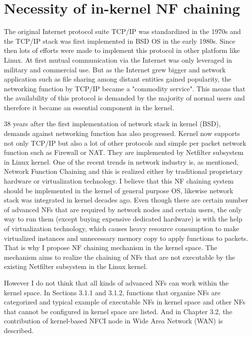 \section{Necessity of in-kernel NF chaining}
The original Internet protocol suite TCP/IP was standardized in the 1970s and the TCP/IP stack was first implemented in BSD OS in the early 1980s. Since then lots of efforts were made to implement this protocol in other platform like Linux. At first mutual communication via the Internet was only leveraged in military and commercial use. But as the Internet grew bigger and network application such as file sharing among distant entities gained popularity, the networking function by TCP/IP became a "commodity service". This means that the availability of this protocol is demanded by the majority of normal users and therefore it became an essential component in the kernel. 

 38 years after the first implementation of network stack in kernel (BSD), demands against networking function has also progressed. Kernel now supports not only TCP/IP but also a lot of other protocols and simple per packet network function such as Firewall or NAT. They are implemented by Netfilter subsystem in Linux kernel. One of the recent trends in network industry is, as mentioned, Network Function Chaining and this is realized either by traditional proprietary hardware or virtualization technology. I believe that this NF chaining system should be implemented in the kernel of general purpose OS, likewise network stack was integrated in kernel decades ago. Even though there are certain number of advanced NFs that are required by network nodes and certain users, the only way to run them (except buying expensive dedicated hardware) is with the help of virtualization technology, which causes heavy resource consumption to make virtualized instances and unnecessary memory copy to apply functions to packets. That is why I propose NF chaining mechanism in the kernel space. The mechanism aims to realize the chaining of NFs that are not executable by the existing Netfilter subsystem in the Linux kernel. 
 
 However I do not think that all kinds of advanced NFs can work within the kernel space. In Sections 3.1.1 and 3.1.2, functions that organize NFs are categorized and typical example of executable NFs in kernel space and other NFs that cannot be configured in kernel space are listed. And in Chapter 3.2, the contribution of kernel-based NFCI node in Wide Area Network (WAN) is described. 
 

